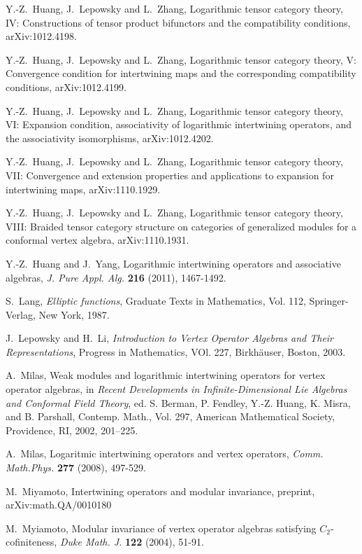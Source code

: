 \documentclass[12pt]{article}
\begin{document}
\begin{thebibliography}{FGST2}
 Y.-Z.~Huang, J.~Lepowsky and L.~Zhang, Logarithmic
tensor category theory, IV: Constructions of tensor product bifunctors and
the compatibility conditions, arXiv:1012.4198.

 Y.-Z.~Huang, J.~Lepowsky and L.~Zhang, Logarithmic
tensor category theory, V: Convergence condition for intertwining maps and the
corresponding compatibility conditions, arXiv:1012.4199.

 Y.-Z.~Huang, J.~Lepowsky and L.~Zhang, Logarithmic
tensor category theory, VI: Expansion condition, associativity of
logarithmic intertwining operators, and the
associativity isomorphisms, arXiv:1012.4202.

 Y.-Z.~Huang, J.~Lepowsky and L.~Zhang, Logarithmic
tensor category theory, VII: Convergence and extension properties and
applications to expansion for intertwining
maps, arXiv:1110.1929.

 Y.-Z.~Huang, J.~Lepowsky and L.~Zhang, Logarithmic
tensor category theory, VIII: Braided tensor category structure on
categories of generalized modules for a
conformal vertex algebra, arXiv:1110.1931.

 Y.-Z.~Huang and J.~Yang, Logarithmic intertwining
operators and associative algebras, {\em J. Pure Appl. Alg.} {\bf 216}
(2011), 1467-1492.

 S.~Lang, {\em Elliptic functions}, Graduate Texts in
Mathematics, Vol. 112, Springer-Verlag, New York, 1987.

 J.~Lepowsky and H.~Li, {\em Introduction to Vertex
Operator Algebras and Their Representations}, Progress in Mathematics,
VOl. 227, Birkh\"auser, Boston, 2003.

 A.~Milas, Weak modules and logarithmic intertwining operators
for vertex operator algebras, in {\em Recent Developments in
Infinite-Dimensional Lie Algebras and Conformal Field Theory},
ed. S. Berman, P. Fendley, Y.-Z. Huang, K. Misra, and B.
Parshall, Contemp. Math., Vol. 297, American Mathematical Society, Providence,
RI, 2002, 201–225. 

 A.~Milas, Logaritmic intertwining operators and vertex
operators, {\em Comm. Math.Phys.} {\bf 277} (2008), 497-529.

 M.~Miyamoto, Intertwining operators and modular
invariance, preprint, arXiv:math.QA/0010180

 M.~Myiamoto, Modular invariance of vertex operator
algebras satisfying $C_2$-cofiniteness, {\em Duke Math. J.} {\bf 122}
(2004), 51-91.


\end{thebibliography}
\end{document}
